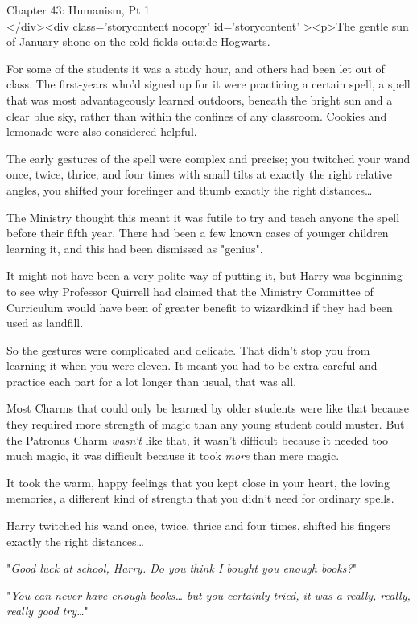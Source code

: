 
Chapter 43: Humanism, Pt 1\\
</div><div  class='storycontent nocopy' id='storycontent' ><p>The gentle sun of 
January shone on the cold fields outside Hogwarts.

For some of the students it was a study hour, and others had been let out of 
class. The first-years who'd signed up for it were practicing a certain spell, 
a spell that was most advantageously learned outdoors, beneath the bright sun 
and a clear blue sky, rather than within the confines of any classroom. Cookies 
and lemonade were also considered helpful.

The early gestures of the spell were complex and precise; you twitched your 
wand once, twice, thrice, and four times with small tilts at exactly the right 
relative angles, you shifted your forefinger and thumb exactly the right 
distances{\ldots}

The Ministry thought this meant it was futile to try and teach anyone the spell 
before their fifth year. There had been a few known cases of younger children 
learning it, and this had been dismissed as "genius".

It might not have been a very polite way of putting it, but Harry was beginning 
to see why Professor Quirrell had claimed that the Ministry Committee of 
Curriculum would have been of greater benefit to wizardkind if they had been 
used as landfill.

So the gestures were complicated and delicate. That didn't stop you from 
learning it when you were eleven. It meant you had to be extra careful and 
practice each part for a lot longer than usual, that was all.

Most Charms that could only be learned by older students were like that because 
they required more strength of magic than any young student could muster. But 
the Patronus Charm \emph{wasn't} like that, it wasn't difficult because it 
needed too much magic, it was difficult because it took \emph{more} than mere 
magic.

It took the warm, happy feelings that you kept close in your heart, the loving 
memories, a different kind of strength that you didn't need for ordinary spells.

Harry twitched his wand once, twice, thrice and four times, shifted his fingers 
exactly the right distances{\ldots}

"\emph{Good luck at school, Harry. Do you think I bought you enough books?}"

"\emph{You can never have enough books{\ldots} but you certainly tried, it was 
a really, really, really good try{\ldots}}"

